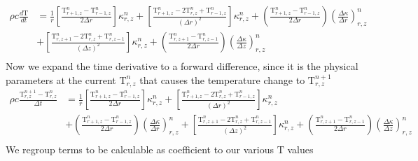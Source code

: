 \documentclass[12pt]{article}
\begin{document}
		\begin{equation}
		\begin{aligned}
		\rho c \frac{d\mathrm{T}}{dt} &= \frac{1}{r} \left [\frac{\mathrm{T}^{n}_{r + 1, z} - \mathrm{T}^{n}_{r - 1, z}}{2\Delta r}  \right ]\kappa^{n}_{r, z} + \left [\frac{\mathrm{T}^{n}_{r + 1, z}  - 2 \mathrm{T}^{n}_{r, z} +  \mathrm{T}^{n}_{r - 1, z}}{(\Delta r)^2} \right ]  \kappa^{n}_{r, z} + (\frac{\mathrm{T}^{n}_{r + 1, z} - \mathrm{T}^{n}_{r - 1, z}}{2\Delta r}) (\frac{\Delta \kappa}{\Delta r})^n_{r, z} \\
		&+ \left [\frac{\mathrm{T}^{n}_{r, z + 1}  - 2 \mathrm{T}^{n}_{r, z} +  \mathrm{T}^{n}_{r, z -1}}{(\Delta z)^2} \right ]\kappa^n_{r, z} + (\frac{\mathrm{T}^{n}_{r, z + 1} - \mathrm{T}^{n}_{r, z - 1}}{2\Delta r})(\frac{\Delta \kappa}{\Delta z})^n_{r, z} \\
		\end{aligned}
		\end{equation}
		Now we expand the time derivative to a forward difference, since it is the physical parameters at the current $\mathrm{T}^n_{r, z}$ that causes the temperature change to $\mathrm{T}^{n + 1}_{r, z}$
		\begin{equation}
		\begin{aligned}
		\rho c \frac{\mathrm{T}^{n+1}_{r, z} - \mathrm{T}^{n}_{r, z}}{\Delta t} &= \frac{1}{r} \left [\frac{\mathrm{T}^{n}_{r + 1, z} - \mathrm{T}^{n}_{r - 1, z}}{2\Delta r}  \right ]\kappa^{n}_{r, z} + \left [\frac{\mathrm{T}^{n}_{r + 1, z}  - 2 \mathrm{T}^{n}_{r, z} +  \mathrm{T}^{n}_{r - 1, z}}{(\Delta r)^2} \right ]  \kappa^{n}_{r, z}  \\
		&+ (\frac{\mathrm{T}^{n}_{r + 1, z} - \mathrm{T}^{n}_{r - 1, z}}{2\Delta r}) (\frac{\Delta \kappa}{\Delta r})^n_{r, z}  + \left [\frac{\mathrm{T}^{n}_{r, z + 1}  - 2 \mathrm{T}^{n}_{r, z} +  \mathrm{T}^{n}_{r, z -1}}{(\Delta z)^2} \right ]\kappa^n_{r, z} + (\frac{\mathrm{T}^{n}_{r, z + 1} - \mathrm{T}^{n}_{r, z - 1}}{2\Delta r})(\frac{\Delta \kappa}{\Delta z})^n_{r, z} \\
		\end{aligned}
		\end{equation}
	  We regroup terms to be calculable as coefficient to our various $\mathrm{T}$ values	
\end{document}

